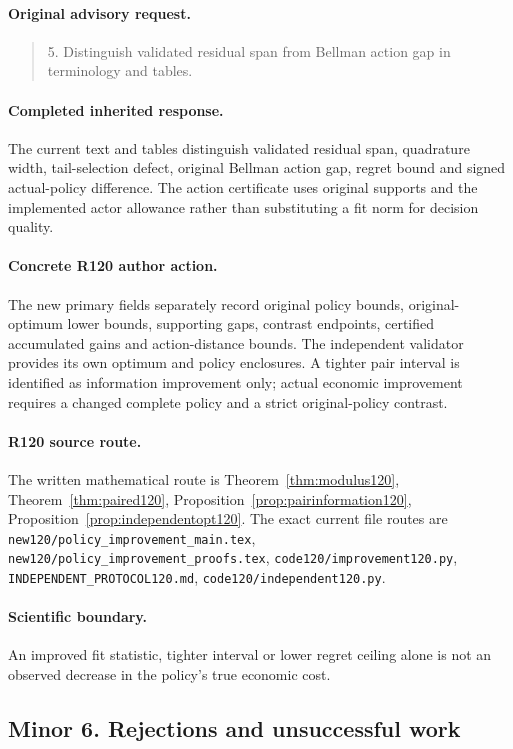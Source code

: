 \paragraph{Original advisory request.}
\begin{quote}
5. Distinguish validated residual span from Bellman action gap in terminology and tables.
\end{quote}
\paragraph{Completed inherited response.}
The current text and tables distinguish validated residual span, quadrature width, tail-selection defect, original Bellman action gap, regret bound and signed actual-policy difference. The action certificate uses original supports and the implemented actor allowance rather than substituting a fit norm for decision quality.
\paragraph{Concrete R120 author action.}
The new primary fields separately record original policy bounds, original-optimum lower bounds, supporting gaps, contrast endpoints, certified accumulated gains and action-distance bounds. The independent validator provides its own optimum and policy enclosures. A tighter pair interval is identified as information improvement only; actual economic improvement requires a changed complete policy and a strict original-policy contrast.
\paragraph{R120 source route.}
The written mathematical route is Theorem~\ref{thm:modulus120}, Theorem~\ref{thm:paired120}, Proposition~\ref{prop:pairinformation120}, Proposition~\ref{prop:independentopt120}. The exact current file routes are \nolinkurl{new120/policy_improvement_main.tex}, \nolinkurl{new120/policy_improvement_proofs.tex}, \nolinkurl{code120/improvement120.py}, \nolinkurl{INDEPENDENT_PROTOCOL120.md}, \nolinkurl{code120/independent120.py}.
\paragraph{Scientific boundary.}
An improved fit statistic, tighter interval or lower regret ceiling alone is not an observed decrease in the policy's true economic cost.

\subsection{Minor 6. Rejections and unsuccessful work}
\label{response120:minor-6}
